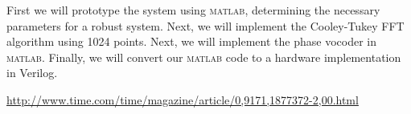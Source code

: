 \documentclass[11pt,letterpaper,oneside]{article}
\begin{document}
	First we will prototype the system using \textsc{matlab}, determining the necessary parameters for a robust system.  
	Next, we will implement the Cooley-Tukey FFT algorithm using 1024 points.
	Next, we will implement the phase vocoder in \textsc{matlab}.
	Finally, we will convert our \textsc{matlab} code to a hardware implementation in Verilog.
		
	\begin{thebibliography}{9}
		\url{http://www.time.com/time/magazine/article/0,9171,1877372-2,00.html}
		
	\end{thebibliography}
\end{document}
